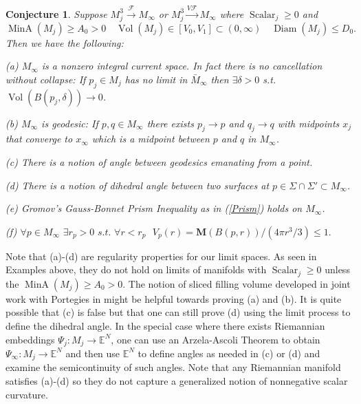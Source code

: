 \documentclass[12pt]{amsart}
\newtheorem{conj}[thm]{Conjecture}
\begin{document}
\begin{conj}\label{fund-conj}
Suppose $M^3_j {\stackrel {\mathcal{F}}{\longrightarrow} } M_\infty$ or $M^3_j {\stackrel {V\mathcal{F}}{\longrightarrow} } M_\infty$ where
 ${\operatorname{Scalar}}_j\ge 0$ and
\begin{equation}
 {\operatorname{MinA}}(M_j)\ge A_0>0 \quad {\operatorname{Vol}}(M_j) \in [V_0,V_1]\subset (0,\infty) \quad {\operatorname{Diam}}(M_j)\le D_0.
\end{equation}
Then we have the following:

\vspace{.2cm}
\noindent
(a) $M_\infty$ is a nonzero integral current space.   In fact there is no
cancellation without collapse: If $p_j\in M_j$ has no limit in $\bar{M}_\infty$ then $\exists \delta>0$
s.t. ${\operatorname{Vol}}(B(p_j, \delta)) \to 0$.

\vspace{.2cm}
\noindent
(b) $M_\infty$ is geodesic: If $p,q\in M_\infty$ there exists $p_j \to p$
and $q_j \to q$ with midpoints $x_j$ that converge to $x_\infty$ which
is a midpoint between $p$ and $q$ in $M_\infty$.

\vspace{.2cm}
\noindent
(c) There is a notion of angle between geodesics emanating from a point.

\vspace{.2cm}
\noindent
(d) There is a notion of dihedral angle
between two surfaces at $p\in \Sigma\cap \Sigma'\subset M_\infty$.

\vspace{.2cm}
\noindent
(e) Gromov's Gauss-Bonnet Prism Inequality as in (\ref{Prism}) holds on $M_\infty$.

\vspace{.2cm}
\noindent
(f) $\forall p\in M_\infty \,\, \exists r_p>0 \,\,s.t. \,\, \forall r<r_p\,\,\,\, 
V_p(r)={{\mathbf M}}(B(p,r)) / (4\pi r^3/3)\le 1.$

\end{conj}

Note that (a)-(d) are regularity properties for our limit spaces.
As seen in Examples above, they do not hold on limits of manifolds
with ${\operatorname{Scalar}}_j\ge 0$ unless the ${\operatorname{MinA}}(M_j)\ge A_0>0$.   The notion
of sliced filling volume developed in joint work with Portegies in \cite{Sormani-properties} might
be helpful towards proving (a) and (b).   It is quite possible that (c) is false
but that one can still prove (d) using the limit process to define the
dihedral angle.   In the special case where there exists Riemannian embeddings
$\Psi_j: M_j \to \mathbb{E}^N$, one can use an Arzela-Ascoli Theorem
to obtain $\Psi_\infty: M_j \to \mathbb{E}^N$ and then use $\mathbb{E}^N$
to define angles as needed in (c) or (d) and examine the semicontinuity of such angles.  
Note that any Riemannian manifold satisfies (a)-(d)
so they do not capture a generalized notion of nonnegative
scalar curvature.  
\end{document}
